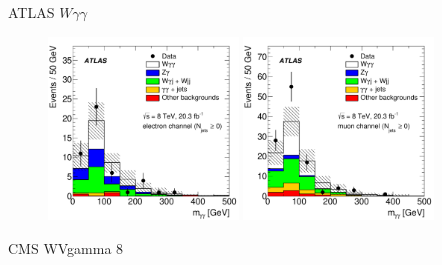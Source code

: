 
ATLAS $W\gamma\gamma$~\cite{Aad:2015uqa}
\begin{figure}[p]
    \centering
    \includegraphics[width=0.45\textwidth]{figures/ss-inclboson-triboson-wgg-ele-atlas8tev.pdf}
    \includegraphics[width=0.45\textwidth]{figures/ss-inclboson-triboson-wgg-mu-atlas8tev.pdf}
    \caption{}
    \label{fig:ss-inclboson-triboson-wgg-atlas8tev}
\end{figure}
CMS WVgamma 8 \TeV~\cite{Chatrchyan:2014bza}

